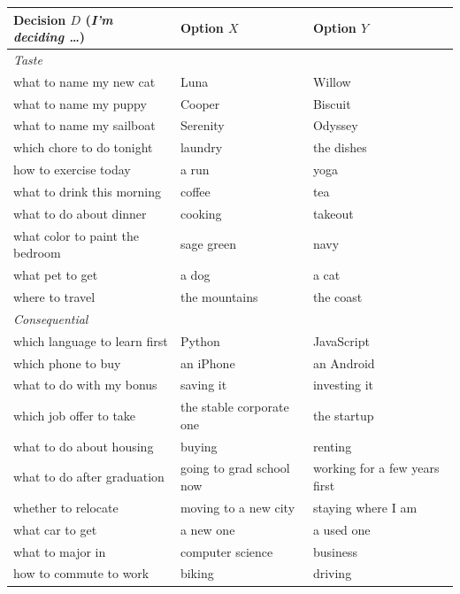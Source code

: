 \bigskip
\noindent\begin{minipage}{\textwidth}
\centering
\small
{}
\label{tab:items}
\begin{tabular}{lll}
\toprule
Decision $D$ (\emph{I'm deciding \ldots}) & Option $X$ & Option $Y$ \\
\midrule
\multicolumn{3}{l}{\emph{Taste}} \\
what to name my new cat & Luna & Willow \\
what to name my puppy & Cooper & Biscuit \\
what to name my sailboat & Serenity & Odyssey \\
which chore to do tonight & laundry & the dishes \\
how to exercise today & a run & yoga \\
what to drink this morning & coffee & tea \\
what to do about dinner & cooking & takeout \\
what color to paint the bedroom & sage green & navy \\
what pet to get & a dog & a cat \\
where to travel & the mountains & the coast \\
\midrule
\multicolumn{3}{l}{\emph{Consequential}} \\
which language to learn first & Python & JavaScript \\
which phone to buy & an iPhone & an Android \\
what to do with my bonus & saving it & investing it \\
which job offer to take & the stable corporate one & the startup \\
what to do about housing & buying & renting \\
what to do after graduation & going to grad school now & working for a few years first \\
whether to relocate & moving to a new city & staying where I am \\
what car to get & a new one & a used one \\
what to major in & computer science & business \\
how to commute to work & biking & driving \\
\bottomrule
\end{tabular}
\end{minipage}
\medskip

